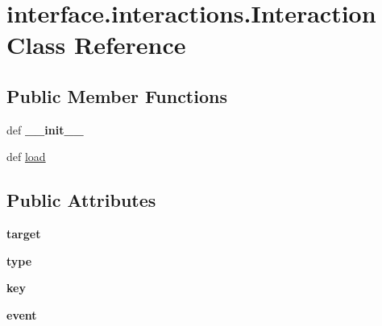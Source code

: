 \hypertarget{classinterface_1_1interactions_1_1_interaction}{\section{interface.\-interactions.\-Interaction \-Class \-Reference}
\label{classinterface_1_1interactions_1_1_interaction}
}
\subsection*{\-Public \-Member \-Functions}
\begin{DoxyCompactItemize}
\item 
\hypertarget{classinterface_1_1interactions_1_1_interaction_a8e24342fbab9b8508ab2c037cb2facf0}{def {\bfseries \-\_\-\-\_\-init\-\_\-\-\_\-}}\label{classinterface_1_1interactions_1_1_interaction_a8e24342fbab9b8508ab2c037cb2facf0}

\item 
def \hyperlink{classinterface_1_1interactions_1_1_interaction_a077e8944f45e377ad3e6c225a545aa86}{load}
\end{DoxyCompactItemize}
\subsection*{\-Public \-Attributes}
\begin{DoxyCompactItemize}
\item 
\hypertarget{classinterface_1_1interactions_1_1_interaction_a00cd1dee9a8dba184edb37428380bb92}{{\bfseries target}}\label{classinterface_1_1interactions_1_1_interaction_a00cd1dee9a8dba184edb37428380bb92}

\item 
\hypertarget{classinterface_1_1interactions_1_1_interaction_afae7611b19a4850489268d42de12281d}{{\bfseries type}}\label{classinterface_1_1interactions_1_1_interaction_afae7611b19a4850489268d42de12281d}

\item 
\hypertarget{classinterface_1_1interactions_1_1_interaction_a684bc327719b7885001513805775aae7}{{\bfseries key}}\label{classinterface_1_1interactions_1_1_interaction_a684bc327719b7885001513805775aae7}

\item 
\hypertarget{classinterface_1_1interactions_1_1_interaction_aa0201055cceaccb25b7808f2e8f39856}{{\bfseries event}}\label{classinterface_1_1interactions_1_1_interaction_aa0201055cceaccb25b7808f2e8f39856}

\end{DoxyCompactItemize}


